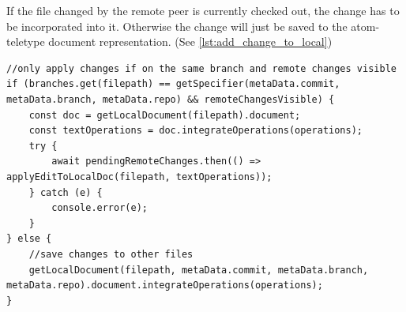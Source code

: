 If the file changed by the remote peer is currently checked out, the change has to be incorporated into it. Otherwise the change will just be saved to the atom-teletype document representation. (See \autoref{lst:add_change_to_local})

\begin{lstlisting}[label={lst:add_change_to_local}, caption=Adding Change to Local Document]
//only apply changes if on the same branch and remote changes visible
if (branches.get(filepath) == getSpecifier(metaData.commit, metaData.branch, metaData.repo) && remoteChangesVisible) {
    const doc = getLocalDocument(filepath).document;
    const textOperations = doc.integrateOperations(operations);
    try {
        await pendingRemoteChanges.then(() => applyEditToLocalDoc(filepath, textOperations));
    } catch (e) {
        console.error(e);
    }
} else {
    //save changes to other files
    getLocalDocument(filepath, metaData.commit, metaData.branch, metaData.repo).document.integrateOperations(operations);
}
\end{lstlisting}